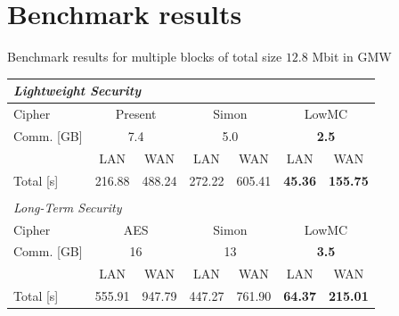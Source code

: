 \documentclass[10pt,compress]{beamer}
\newcommand{\sml}{43.33}
\newcommand{\oml}{2.02}
\newcommand{\tml}{45.36}
\newcommand{\smw}{138.63}
\newcommand{\omw}{17.12}
\newcommand{\tmw}{155.75}
\begin{document}
\section{Benchmark results}

\begin{frame}{Benchmark results for multiple blocks of total size $12.8$ Mbit in GMW}
\centering
\begin{table}
\scriptsize
\centering
\begin{tabular}{ l r r r r r r}
\multicolumn{7}{l}{\emph{Lightweight Security}} \\
\toprule
Cipher &  \multicolumn{2}{c}{Present} & \multicolumn{2}{c}{Simon} & \multicolumn{2}{c}{LowMC} \\
\midrule
Comm. [GB] & \multicolumn{2}{c}{7.4} & \multicolumn{2}{c}{5.0} & \multicolumn{2}{c}{\bf 2.5} \\
\midrule
 & \multicolumn{1}{c}{LAN} & \multicolumn{1}{c}{WAN} & \multicolumn{1}{c}{LAN} & \multicolumn{1}{c}{WAN} & \multicolumn{1}{c}{LAN} & \multicolumn{1}{c}{WAN} \\
Total [s]  & 216.88 & 488.24 & 272.22 & 605.41 &  \bf \tml & \bf \tmw \\
\bottomrule
\\[0.5cm]
\multicolumn{7}{l}{\emph{Long-Term Security}} \\
\toprule
Cipher & \multicolumn{2}{c}{AES} & \multicolumn{2}{c}{Simon} & \multicolumn{2}{c}{LowMC} \\
\midrule
Comm. [GB] & \multicolumn{2}{c}{16} & \multicolumn{2}{c}{13} & \multicolumn{2}{c}{\bf 3.5} \\
\midrule
  & \multicolumn{1}{c}{LAN} & \multicolumn{1}{c}{WAN} & \multicolumn{1}{c}{LAN} & \multicolumn{1}{c}{WAN} & \multicolumn{1}{c}{LAN} & \multicolumn{1}{c}{WAN} \\
Total [s] &   555.91 & 947.79 & 447.27 & 761.90 & \bf 64.37    & \bf 215.01 \\
\bottomrule
\end{tabular}
\end{table}
\end{frame}
\end{document}
